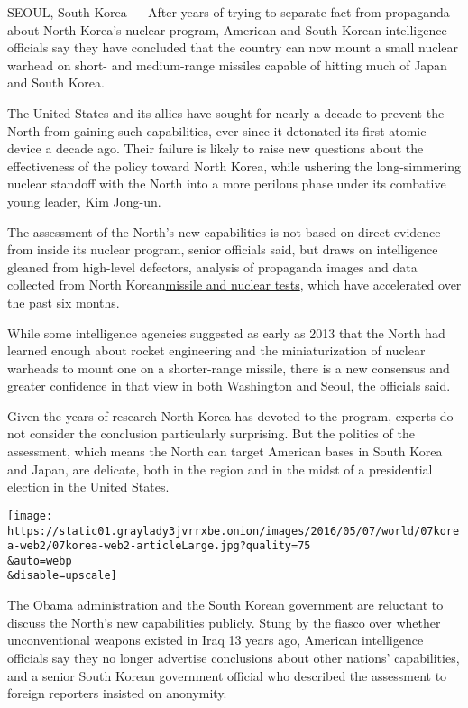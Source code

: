 SEOUL, South Korea --- After years of trying to separate fact from
propaganda about North Korea's nuclear program, American and South
Korean intelligence officials say they have concluded that the country
can now mount a small nuclear warhead on short- and medium-range
missiles capable of hitting much of Japan and South Korea.

The United States and its allies have sought for nearly a decade to
prevent the North from gaining such capabilities, ever since it
detonated its first atomic device a decade ago. Their failure is likely
to raise new questions about the effectiveness of the policy toward
North Korea, while ushering the long-simmering nuclear standoff with the
North into a more perilous phase under its combative young leader, Kim
Jong-un.

The assessment of the North's new capabilities is not based on direct
evidence from inside its nuclear program, senior officials said, but
draws on intelligence gleaned from high-level defectors, analysis of
propaganda images and data collected from North
Korean\href{http://www.nytimes3xbfgragh.onion/topic/subject/north-koreas-nuclear-program?8qa}{missile
and nuclear tests}, which have accelerated over the past six months.

While some intelligence agencies suggested as early as 2013 that the
North had learned enough about rocket engineering and the
miniaturization of nuclear warheads to mount one on a shorter-range
missile, there is a new consensus and greater confidence in that view in
both Washington and Seoul, the officials said.

Given the years of research North Korea has devoted to the program,
experts do not consider the conclusion particularly surprising. But the
politics of the assessment, which means the North can target American
bases in South Korea and Japan, are delicate, both in the region and in
the midst of a presidential election in the United States.

\texttt{[image: https://static01.graylady3jvrrxbe.onion/images/2016/05/07/world/07korea-web2/07korea-web2-articleLarge.jpg?quality=75\\\&auto=webp\\\&disable=upscale]}

The Obama administration and the South Korean government are reluctant
to discuss the North's new capabilities publicly. Stung by the fiasco
over whether unconventional weapons existed in Iraq 13 years ago,
American intelligence officials say they no longer advertise conclusions
about other nations' capabilities, and a senior South Korean government
official who described the assessment to foreign reporters insisted on
anonymity.

